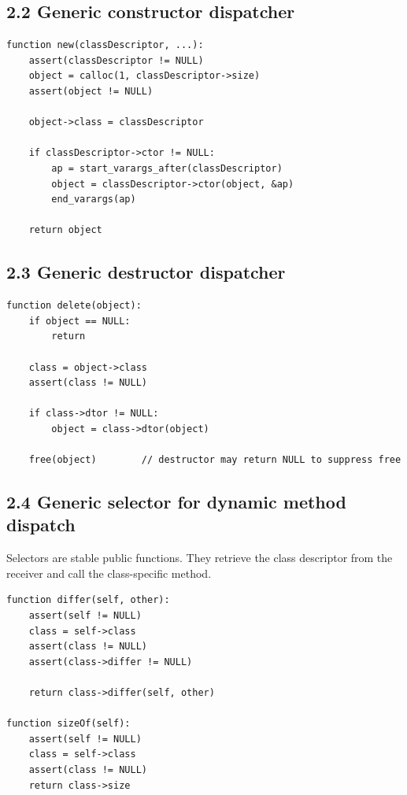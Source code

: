 \documentclass[11pt]{article}
\begin{document}
\subsection{2.2 Generic constructor
dispatcher}\label{generic-constructor-dispatcher}

\begin{verbatim}
function new(classDescriptor, ...):
    assert(classDescriptor != NULL)
    object = calloc(1, classDescriptor->size)
    assert(object != NULL)

    object->class = classDescriptor

    if classDescriptor->ctor != NULL:
        ap = start_varargs_after(classDescriptor)
        object = classDescriptor->ctor(object, &ap)
        end_varargs(ap)

    return object
\end{verbatim}

\subsection{2.3 Generic destructor
dispatcher}\label{generic-destructor-dispatcher}

\begin{verbatim}
function delete(object):
    if object == NULL:
        return

    class = object->class
    assert(class != NULL)

    if class->dtor != NULL:
        object = class->dtor(object)

    free(object)        // destructor may return NULL to suppress free
\end{verbatim}

\subsection{2.4 Generic selector for dynamic method
dispatch}\label{generic-selector-for-dynamic-method-dispatch}

Selectors are stable public functions. They retrieve the class
descriptor from the receiver and call the class-specific method.

\begin{verbatim}
function differ(self, other):
    assert(self != NULL)
    class = self->class
    assert(class != NULL)
    assert(class->differ != NULL)

    return class->differ(self, other)

function sizeOf(self):
    assert(self != NULL)
    class = self->class
    assert(class != NULL)
    return class->size
\end{verbatim}
\end{document}

